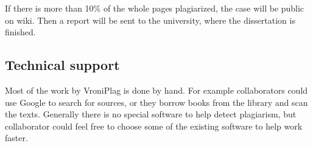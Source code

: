 If there is more than 10\% of the whole pages plagiarized, the case will be public on wiki. Then a report will be sent 
to the university, where the dissertation is finished.

\subsection{Technical support}

Most of the work by VroniPlag is done by hand. For example collaborators could use Google to search for sources, 
or they borrow books from the library and scan the texts. Generally there is no special software to help detect 
plagiarism, but collaborator could feel free to choose some of the existing software to help work faster.

